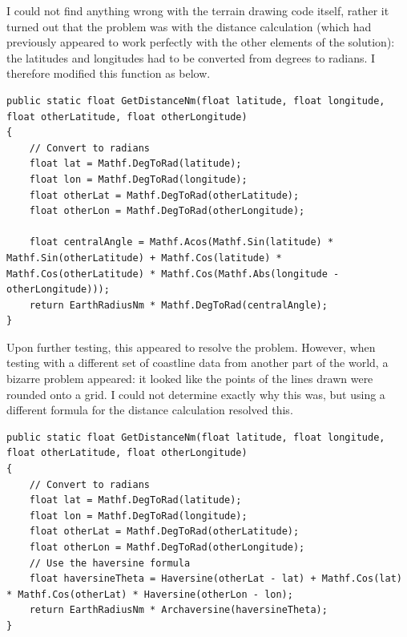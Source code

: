 \documentclass{article}
\begin{document}
I could not find anything wrong with the terrain drawing code itself, rather it turned out that the problem was with the distance calculation (which had previously appeared to work perfectly with the other elements of the solution): the latitudes and longitudes had to be converted from degrees to radians.
I therefore modified this function as below.
\lstset{style=csharp}
\begin{lstlisting}[caption=Modified distance function]
public static float GetDistanceNm(float latitude, float longitude, float otherLatitude, float otherLongitude)
{
    // Convert to radians
    float lat = Mathf.DegToRad(latitude);
    float lon = Mathf.DegToRad(longitude);
    float otherLat = Mathf.DegToRad(otherLatitude);
    float otherLon = Mathf.DegToRad(otherLongitude);
    
    float centralAngle = Mathf.Acos(Mathf.Sin(latitude) * Mathf.Sin(otherLatitude) + Mathf.Cos(latitude) * Mathf.Cos(otherLatitude) * Mathf.Cos(Mathf.Abs(longitude - otherLongitude)));
    return EarthRadiusNm * Mathf.DegToRad(centralAngle);
}
\end{lstlisting}
Upon further testing, this appeared to resolve the problem.
However, when testing with a different set of coastline data from another part of the world, a bizarre problem appeared: it looked like the points of the lines drawn were rounded onto a grid.
I could not determine exactly why this was, but using a different formula for the distance calculation resolved this.
\lstset{style=csharp}
\begin{lstlisting}[caption=Final distance function with the Haversine formula]
public static float GetDistanceNm(float latitude, float longitude, float otherLatitude, float otherLongitude)
{
    // Convert to radians
    float lat = Mathf.DegToRad(latitude);
    float lon = Mathf.DegToRad(longitude);
    float otherLat = Mathf.DegToRad(otherLatitude);
    float otherLon = Mathf.DegToRad(otherLongitude);
    // Use the haversine formula
    float haversineTheta = Haversine(otherLat - lat) + Mathf.Cos(lat) * Mathf.Cos(otherLat) * Haversine(otherLon - lon);
    return EarthRadiusNm * Archaversine(haversineTheta);
}
\end{lstlisting}
\end{document}
